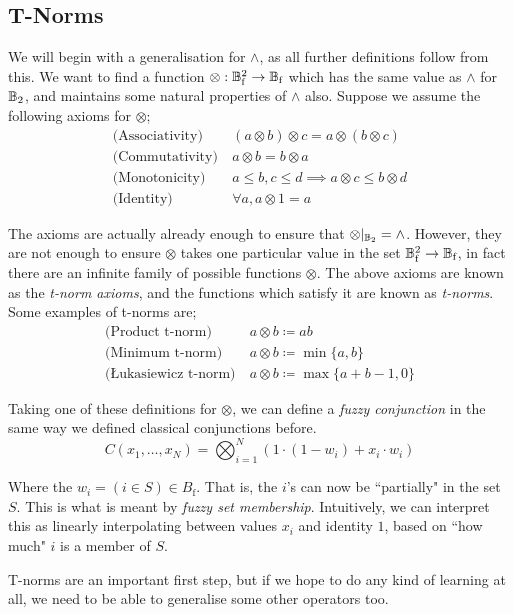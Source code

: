 \documentclass[conference]{report}
\begin{document}
\subsection{T-Norms}

We will begin with a generalisation for $\land$, as all further definitions follow from this. We want to find a function $\otimes : \mathbb{B}_\text{f}^2 \to \mathbb{B}_\text{f}$ which has the same value as $\land$ for $\mathbb{B}_2$, and maintains some natural properties of $\land$ also. Suppose we assume the following axioms for $\otimes$;
$$
\begin{aligned}
\text{(Associativity)}&\ (a \otimes b) \otimes c = a \otimes (b \otimes c) \\
\text{(Commutativity)}&\ a \otimes b = b \otimes a \\
\text{(Monotonicity)}&\ a \leq b, c \leq d \implies a \otimes c \leq b \otimes d \\
\text{(Identity)}&\ \forall a, a \otimes 1 = a
\end{aligned}
$$
 
The axioms are actually already enough to ensure that $\otimes |_{\mathbb{B}_2} = \land$. However, they are not enough to ensure $\otimes$ takes one particular value in the set $\mathbb{B}_\text{f}^2 \to \mathbb{B}_\text{f}$, in fact there are an infinite family of possible functions $\otimes$. The above axioms are known as the \textit{t-norm axioms}, and the functions which satisfy it are known as \textit{t-norms}. Some examples of t-norms are;
$$
\begin{aligned}
    \text{(Product t-norm)}&\ a \otimes b \coloneqq ab \\
    \text{(Minimum t-norm)}&\ a \otimes b \coloneqq \min\{a,b\} \\
    \text{(Łukasiewicz t-norm)}&\ a \otimes b \coloneqq \max\{a+b-1,0\}
\end{aligned}
$$

Taking one of these definitions for $\otimes$, we can define a \textit{fuzzy conjunction} in the same way we defined classical conjunctions before.
$$C(x_1, \dots, x_N) = \bigotimes_{i=1}^N(1 \cdot (1-w_i) + x_i \cdot w_i)$$

Where the $w_i = (i \in S) \in B_\text{f}$. That is, the $i$'s can now be ``partially" in the set $S$. This is what is meant by \textit{fuzzy set membership}. Intuitively, we can interpret this as linearly interpolating between values $x_i$ and identity $1$, based on ``how much" $i$ is a member of $S$.

T-norms are an important first step, but if we hope to do any kind of learning at all, we need to be able to generalise some other operators too.
\end{document}
